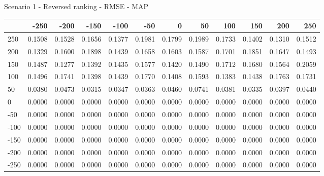 Scenario 1 - Reversed ranking - RMSE - MAP
\begin{tabular}{lrrrrrrrrrrr}
\toprule
{} &   -250 &   -200 &   -150 &   -100 &   -50  &    0   &    50  &    100 &    150 &    200 &    250 \\
\midrule
 250 & 0.1508 & 0.1528 & 0.1656 & 0.1377 & 0.1981 & 0.1799 & 0.1989 & 0.1733 & 0.1402 & 0.1310 & 0.1512 \\
 200 & 0.1329 & 0.1600 & 0.1898 & 0.1439 & 0.1658 & 0.1603 & 0.1587 & 0.1701 & 0.1851 & 0.1647 & 0.1493 \\
 150 & 0.1487 & 0.1277 & 0.1392 & 0.1435 & 0.1577 & 0.1420 & 0.1490 & 0.1712 & 0.1680 & 0.1564 & 0.2059 \\
 100 & 0.1496 & 0.1741 & 0.1398 & 0.1439 & 0.1770 & 0.1408 & 0.1593 & 0.1383 & 0.1438 & 0.1763 & 0.1731 \\
 50  & 0.0380 & 0.0473 & 0.0315 & 0.0347 & 0.0363 & 0.0460 & 0.0741 & 0.0381 & 0.0335 & 0.0397 & 0.0440 \\
 0   & 0.0000 & 0.0000 & 0.0000 & 0.0000 & 0.0000 & 0.0000 & 0.0000 & 0.0000 & 0.0000 & 0.0000 & 0.0000 \\
-50  & 0.0000 & 0.0000 & 0.0000 & 0.0000 & 0.0000 & 0.0000 & 0.0000 & 0.0000 & 0.0000 & 0.0000 & 0.0000 \\
-100 & 0.0000 & 0.0000 & 0.0000 & 0.0000 & 0.0000 & 0.0000 & 0.0000 & 0.0000 & 0.0000 & 0.0000 & 0.0000 \\
-150 & 0.0000 & 0.0000 & 0.0000 & 0.0000 & 0.0000 & 0.0000 & 0.0000 & 0.0000 & 0.0000 & 0.0000 & 0.0000 \\
-200 & 0.0000 & 0.0000 & 0.0000 & 0.0000 & 0.0000 & 0.0000 & 0.0000 & 0.0000 & 0.0000 & 0.0000 & 0.0000 \\
-250 & 0.0000 & 0.0000 & 0.0000 & 0.0000 & 0.0000 & 0.0000 & 0.0000 & 0.0000 & 0.0000 & 0.0000 & 0.0000 \\
\bottomrule
\end{tabular}

